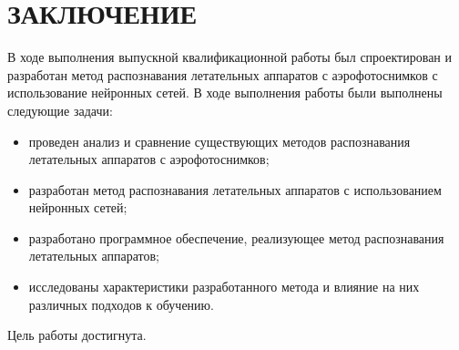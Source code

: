 \chapter*{ЗАКЛЮЧЕНИЕ}

В ходе выполнения выпускной квалификационной работы был спроектирован и разработан метод распознавания летательных аппаратов с аэрофотоснимков с использование нейронных сетей. В ходе выполнения работы были выполнены следующие задачи:
\begin{itemize}
	\item проведен анализ и сравнение существующих методов распознавания летательных аппаратов с аэрофотоснимков;
	\item разработан метод распознавания летательных аппаратов с использованием нейронных сетей;
	\item разработано программное обеспечение, реализующее метод распознавания летательных аппаратов;
	\item исследованы характеристики разработанного метода и влияние на них различных подходов к обучению.
\end{itemize}

Цель работы достигнута.